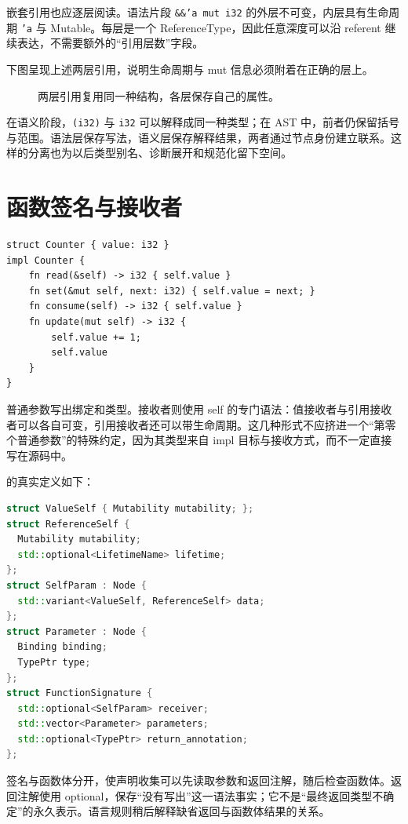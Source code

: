 嵌套引用也应逐层阅读。语法片段 \texttt{\&\&'a mut i32} 的外层不可变，内层具有生命周期 \texttt{'a} 与 Mutable。每层是一个 ReferenceType，因此任意深度可以沿 referent 继续表达，不需要额外的“引用层数”字段。

下图呈现上述两层引用，说明生命周期与 mut 信息必须附着在正确的层上。
\begin{figure}[htbp]
\centering
{}
\caption{两层引用复用同一种结构，各层保存自己的属性。}
\end{figure}
在语义阶段，\texttt{(i32)} 与 \texttt{i32} 可以解释成同一种类型；在 AST 中，前者仍保留括号与范围。语法层保存写法，语义层保存解释结果，两者通过节点身份建立联系。这样的分离也为以后类型别名、诊断展开和规范化留下空间。

\section{函数签名与接收者}
\begin{lstlisting}[language=Rustless]
struct Counter { value: i32 }
impl Counter {
    fn read(&self) -> i32 { self.value }
    fn set(&mut self, next: i32) { self.value = next; }
    fn consume(self) -> i32 { self.value }
    fn update(mut self) -> i32 {
        self.value += 1;
        self.value
    }
}
\end{lstlisting}
普通参数写出绑定和类型。接收者则使用 self 的专门语法：值接收者与引用接收者可以各自可变，引用接收者还可以带生命周期。这几种形式不应挤进一个“第零个普通参数”的特殊约定，因为其类型来自 impl 目标与接收方式，而不一定直接写在源码中。

 的真实定义如下：
\begin{lstlisting}[language=C++]
struct ValueSelf { Mutability mutability; };
struct ReferenceSelf {
  Mutability mutability;
  std::optional<LifetimeName> lifetime;
};
struct SelfParam : Node {
  std::variant<ValueSelf, ReferenceSelf> data;
};
struct Parameter : Node {
  Binding binding;
  TypePtr type;
};
struct FunctionSignature {
  std::optional<SelfParam> receiver;
  std::vector<Parameter> parameters;
  std::optional<TypePtr> return_annotation;
};
\end{lstlisting}
签名与函数体分开，使声明收集可以先读取参数和返回注解，随后检查函数体。返回注解使用 optional，保存“没有写出”这一语法事实；它不是“最终返回类型不确定”的永久表示。语言规则稍后解释缺省返回与函数体结果的关系。

